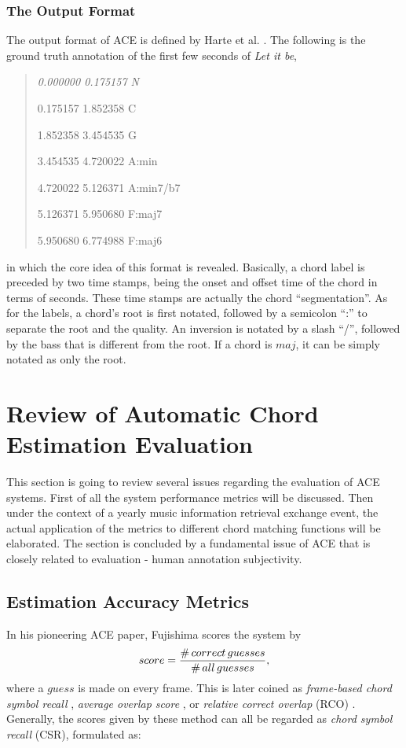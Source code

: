 \subsubsection{The Output Format}
The output format of ACE is defined by Harte et al. \cite{harte2005symbolic}. The following is the ground truth annotation of the first few seconds of {\it Let it be},
\begin{quote}\footnotesize \it
0.000000 0.175157 N

0.175157 1.852358 C

1.852358 3.454535 G

3.454535 4.720022 A:min

4.720022 5.126371 A:min7/b7

5.126371 5.950680 F:maj7

5.950680 6.774988 F:maj6
\end{quote}
in which the core idea of this format is revealed. Basically, a chord label is preceded by two time stamps, being the onset and offset time of the chord in terms of seconds. These time stamps are actually the chord ``segmentation''. As for the labels, a chord's root is first notated, followed by a semicolon ``:'' to separate the root and the quality. An inversion is notated by a slash ``/'', followed by the bass that is different from the root. If a chord is $maj$, it can be simply notated as only the root.

\newpage
\section{Review of Automatic Chord Estimation Evaluation} \label{sec:2-eval}
This section is going to review several issues regarding the evaluation of ACE systems. First of all the system performance metrics will be discussed. Then under the context of a yearly music information retrieval exchange event, the actual application of the metrics to different chord matching functions will be elaborated. The section is concluded by a fundamental issue of ACE that is closely related to evaluation - human annotation subjectivity.

\subsection{Estimation Accuracy Metrics}
In his pioneering ACE paper, Fujishima \cite{fujishima1999realtime} scores the system by
\begin{equation}
score = {\#\,correct\,guesses\over\#\,all\,guesses},
\end{equation}
where a $guess$ is made on every frame. This is later coined as {\it frame-based chord symbol recall} \cite{harte2010towards}, {\it average overlap score} \cite{oudre2010template}, or {\it relative correct overlap} (RCO) \cite{mauch2010automatic}. Generally, the scores given by these method can all be regarded as {\it chord symbol recall} (CSR), formulated as:

